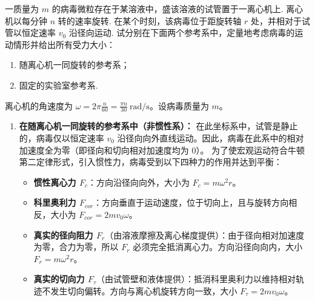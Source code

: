 \begin{exercise}\label{ex:2.16}
一质量为 $m$ 的病毒微粒存在于某溶液中，盛该溶液的试管置于一离心机上. 离心机以每分钟 $n$ 转的速率旋转. 在某个时刻，该病毒位于距旋转轴 $r$ 处，并相对于试管以恒定速率 $v_0$ 沿径向运动. 试分别在下面两个参考系中，定量地考虑病毒的运动情形并给出所有受力大小：
\begin{enumerate}
  \item[(a)] 随离心机一同旋转的参考系；
  \item[(b)] 固定的实验室参考系.
\end{enumerate}
\end{exercise}
\begin{solution}
离心机的角速度为 $\omega = 2\pi \frac{n}{60} = \frac{\pi n}{30} \ \mathrm{rad/s}$。设病毒质量为 $m$。

\begin{enumerate}
    \item[(a)] \textbf{在随离心机一同旋转的参考系中（非惯性系）：}
    在此坐标系中，试管是静止的，病毒仅以恒定速率 $v_0$ 沿径向向外直线运动。因此，病毒在此系中的相对加速度全为零（即径向和切向相对加速度均为 0）。
    为了使宏观运动符合牛顿第二定律形式，引入惯性力，病毒受到以下四种力的作用并达到平衡：
    \begin{itemize}
        \item \textbf{惯性离心力 $F_c$}：方向沿径向向外，大小为 $F_c = m\omega^2 r$。
        \item \textbf{科里奥利力 $F_{cor}$}：方向垂直于运动速度，位于切向上，且与旋转方向相反，大小为 $F_{cor} = 2m v_0 \omega$。
        \item \textbf{真实的径向阻力 $F_r$}（由溶液摩擦及离心梯度提供）：由于径向相对加速度为零，合力为零，所以 $F_r$ 必须完全抵消离心力。方向沿径向向内，大小 $F_r = m\omega^2 r$。
        \item \textbf{真实的切向力 $F_\tau$}（由试管壁和液体提供）：抵消科里奥利力以维持相对轨迹不发生切向偏转。方向与离心机旋转方向一致，大小 $F_\tau = 2m v_0 \omega$。
    \end{itemize}


\end{enumerate}
\end{solution}
